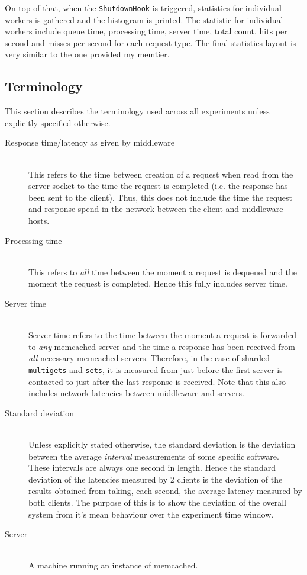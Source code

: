 \documentclass[11pt,a4paper]{article}
\begin{document}
On top of that, when the \texttt{ShutdownHook} is triggered, statistics for individual workers is gathered and the histogram is printed. The statistic for individual workers include queue time, processing time, server time, total count, hits per second and misses per second for each request type. The final statistics layout is very similar to the one provided my memtier.

\subsection{Terminology}
This section describes the terminology used across all experiments unless explicitly specified otherwise.
\begin{description}
    \item[Response time/latency as given by middleware]\hfill\\ This refers to the time between creation of a request when read from the server socket to the time the request is completed (i.e. the response has been sent to the client). Thus, this does not include the time the request and response spend in the network between the client and middleware hosts.
    \item[Processing time]\hfill\\ This refers to \textit{all} time between the moment a request is dequeued and the moment the request is completed. Hence this fully includes server time.
    \item[Server time]\hfill\\ Server time refers to the time between the moment a request is forwarded to \textit{any} memcached server and the time a response has been received from \textit{all} necessary memcached servers. Therefore, in the case of sharded \texttt{multigets} and \texttt{sets}, it is measured from just before the first server is contacted to just after the last response is received. Note that this also includes network latencies between middleware and servers.
    \item[Standard deviation]\hfill\\ Unless explicitly stated otherwise, the standard deviation is the deviation between the average \textit{interval} measurements of some specific software. These intervals are always one second in length. Hence the standard deviation of the latencies measured by 2 clients is the deviation of the results obtained from taking, each second, the average latency measured by both clients. The purpose of this is to show the deviation of the overall system from it's mean behaviour over the experiment time window.
    \item[Server]\hfill\\ A machine running an instance of memcached.
\end{description}
\end{document}
